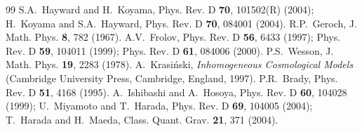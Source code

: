 \documentclass[aps,prd,twocolumn,eqsecnum,showpacs,amsmath]{revtex4}
\begin{document}
\begin{thebibliography}{99}
S.A.~Hayward and H.~Koyama,
Phys. Rev. D {\bf 70}, 101502(R) (2004);
H.~Koyama and S.A.~Hayward,
Phys. Rev. D {\bf 70}, 084001 (2004).
R.P.~Geroch,
J. Math. Phys. {\bf 8}, 782 (1967).
A.V.~Frolov,
Phys. Rev. D {\bf 56}, 6433 (1997);
Phys. Rev. D {\bf 59}, 104011 (1999);
Phys. Rev. D {\bf 61}, 084006 (2000).
P.S.~Wesson,
J. Math. Phys. {\bf 19}, 2283 (1978).
A.~Krasi\'{n}ski, 
{\it Inhomogeneous Cosmological Models}
(Cambridge University Press, Cambridge, England, 1997).
P.R.~Brady,
Phys. Rev. D {\bf 51}, 4168 (1995). 
A.~Ishibashi and A.~Hosoya,
Phys. Rev. D {\bf 60}, 104028 (1999);
U.~Miyamoto and T.~Harada, 
Phys. Rev. D {\bf 69}, 104005 (2004);
T.~Harada and H.~Maeda, 
Class. Quant. Grav. {\bf 21}, 371 (2004).





\end{thebibliography}
\end{document}
